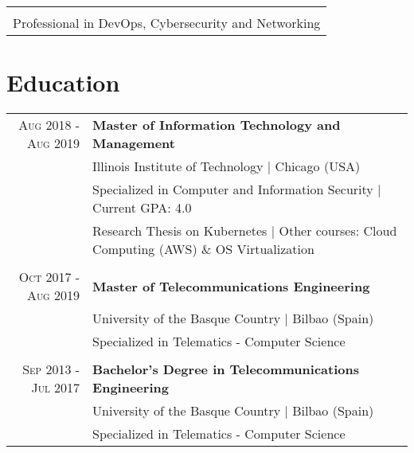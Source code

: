 \documentclass[a4paper,10pt]{article}
\begin{document}
\vspace{-.00in}

\begin{center}
\begin{tabular}{c}
  \hline \\[-0.8em]
  Professional in DevOps, Cybersecurity and Networking
\end{tabular}
\end{center}


\renewcommand{\arraystretch}{0.7}%
\section{Education}
\begin{tabular}{rp{13.6cm}}

 \textsc{Aug 2018 - Aug 2019}& \textbf{Master of Information Technology and Management}\\
 & \footnotesize{Illinois Institute of Technology | Chicago (USA)} \\
 & Specialized in Computer and Information Security | Current GPA: 4.0 \\ 
 & \footnotesize{Research Thesis on Kubernetes | Other courses: Cloud Computing (AWS) \& OS Virtualization} \\\vspace{-0.05in}&\\

 \textsc{Oct 2017 - Aug 2019}& \textbf{Master of Telecommunications Engineering}\\
 & \footnotesize{University of the Basque Country | Bilbao (Spain)} \\
 & Specialized in Telematics - Computer Science \\\vspace{-0.05in}&\\
 
 \textsc{Sep 2013 - Jul 2017}& \textbf{Bachelor's Degree in Telecommunications Engineering}\\
 & \footnotesize{University of the Basque Country | Bilbao (Spain)} \\
 & Specialized in Telematics - Computer Science 

\end{tabular}
\end{document}
